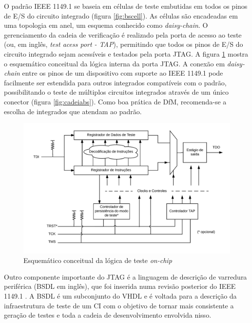 O padrão IEEE 1149.1 se baseia em células de teste embutidas em todos os pinos de E/S do circuito integrado (figura \ref{fig:bscell}). As células são encadeadas em uma topologia em anel, um esquema conhecido como \textit{daisy-chain}. O gerenciamento da cadeia de verificação é realizado pela porta de acesso ao teste (ou, em inglês, \textit{test acess port - TAP}), permitindo que todos os pinos de E/S do circuito integrado sejam acessíveis e testados pela porta JTAG. A figura \ref{fig:tap} mostra o esquemático conceitual da lógica interna da porta JTAG. A conexão em \textit{daisy-chain} entre os pinos de um dispositivo com suporte ao IEEE 1149.1 pode facilmente ser estendida para outros integrados compatíveis com o padrão, possibilitando o teste de múltiplos circuitos integrados através de um único conector (figura \ref{fig:cadeiabs}). Como boa prática de DfM, recomenda-se a escolha de integrados que atendam ao padrão.

\begin{figure}
    \centering
        \includegraphics[width=1.0\linewidth]{fig/TAP}
            \caption{Esquemático conceitual da lógica de teste \textit{on-chip}}
            \label{fig:tap}
\end{figure}

Outro componente importante do JTAG é a linguagem de descrição de varredura periférica (BSDL em inglês), que foi inserida numa revisão posterior do IEEE 1149.1 \citep{ieee11491de94}. A BSDL é um subconjunto do VHDL e é voltada para a descrição da infraestrutura de teste de um CI com o objetivo de tornar mais consistente a geração de testes e toda a cadeia de desenvolvimento envolvida nisso.

